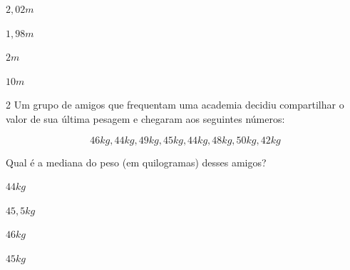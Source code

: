 {{\begin{multicols}{2}
\begin{escolha}[itemsep=0pt]
\item $2,02 m$
\item $1,98 m$
\item $2 m$
\item $10 m$
\end{escolha}
\end{multicols}











\num{2} Um grupo de amigos que frequentam uma academia decidiu compartilhar o
valor de sua última pesagem e chegaram aos seguintes números:

$$46kg, 44kg, 49kg, 45kg, 44kg, 48kg, 50kg, 42kg$$

Qual é a mediana do peso (em quilogramas) desses amigos?

\begin{multicols}{2}
\begin{escolha}[itemsep=0pt]
\item $44kg$
\item $45,5kg$
\item $46 kg$
\item $45kg$
\end{escolha}
\end{multicols}


}}
